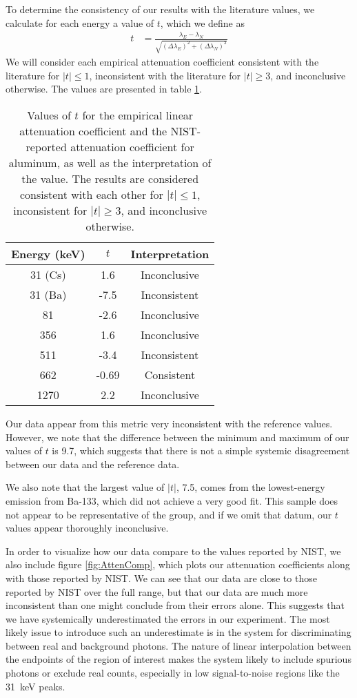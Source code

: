 \documentclass[letter]{article}
\begin{document}
To determine the consistency of our results with the literature values, we calculate for each energy a value of $t$, which we define as
\begin{align}
t
&=
\frac{\lambda_E - \lambda_N}{\sqrt{ (\Delta \lambda_E)^2 + (\Delta \lambda_N)^2 }}
\end{align}
We will consider each empirical attenuation coefficient consistent with the literature for $|t| \leq 1$, inconsistent with the literature for $|t| \geq 3$, and inconclusive otherwise. The values are presented in table \ref{tab:tValues}.

\begin{table}[h] 
\centering  \begin{tabular}{ c  c   c  } 
Energy (\unit{\kilo\electronvolt}) & $t$ & Interpretation  \\ \hline
31 (Cs) & 1.6 & Inconclusive \\ 
31 (Ba) &  -7.5 & Inconsistent \\
81 &  -2.6 & Inconclusive \\
356 &  1.6 & Inconclusive \\
511 &  -3.4 & Inconsistent \\
662 &  -0.69 & Consistent \\
1270 &  2.2 & Inconclusive 
\end{tabular}
\caption{Values of $t$ for the empirical linear attenuation coefficient and the NIST-reported attenuation coefficient for aluminum, as well as the interpretation of the value. The results are considered consistent with each other for $|t| \leq 1$, inconsistent for $|t|\geq3$, and inconclusive otherwise.}
\label{tab:tValues}
\end{table}

Our data appear from this metric very inconsistent with the reference values. However, we note that the difference between the minimum and maximum of our values of $t$ is 9.7, which suggests that there is not a simple systemic disagreement between our data and the reference data.

We also note that the largest value of $|t|$, 7.5, comes from the lowest-energy emission from Ba-133, which did not achieve a very good fit. This sample does not appear to be representative of the group, and if we omit that datum, our $t$ values appear thoroughly inconclusive.

In order to visualize how our data compare to the values reported by NIST, we also include figure \ref{fig:AttenComp}, which plots our attenuation coefficients along with those reported by NIST. We can see that our data are close to those reported by NIST over the full range, but that our data are much more inconsistent than one might conclude from their errors alone. This suggests that we have systemically underestimated the errors in our experiment. The most likely issue to introduce such an underestimate is in the system for discriminating between real and background photons. The nature of linear interpolation between the endpoints of the region of interest makes the system likely to include spurious photons or exclude real counts, especially in low signal-to-noise regions like the \qty{31}{\kilo\electronvolt} peaks.
\end{document}
